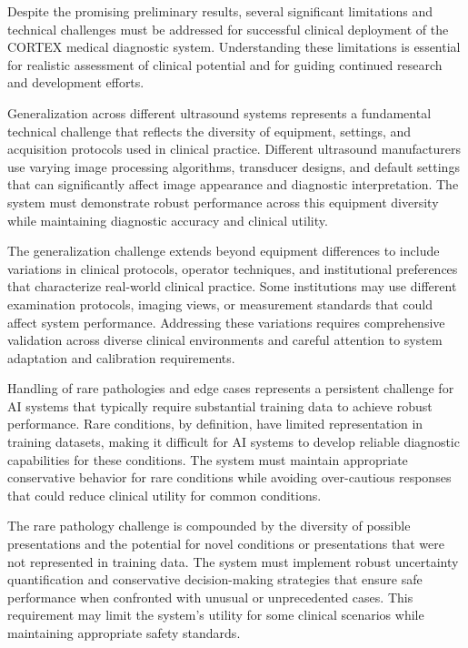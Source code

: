 Despite the promising preliminary results, several significant limitations and technical challenges must be addressed for successful clinical deployment of the CORTEX medical diagnostic system. Understanding these limitations is essential for realistic assessment of clinical potential and for guiding continued research and development efforts.

Generalization across different ultrasound systems represents a fundamental technical challenge that reflects the diversity of equipment, settings, and acquisition protocols used in clinical practice. Different ultrasound manufacturers use varying image processing algorithms, transducer designs, and default settings that can significantly affect image appearance and diagnostic interpretation. The system must demonstrate robust performance across this equipment diversity while maintaining diagnostic accuracy and clinical utility.

The generalization challenge extends beyond equipment differences to include variations in clinical protocols, operator techniques, and institutional preferences that characterize real-world clinical practice. Some institutions may use different examination protocols, imaging views, or measurement standards that could affect system performance. Addressing these variations requires comprehensive validation across diverse clinical environments and careful attention to system adaptation and calibration requirements.

Handling of rare pathologies and edge cases represents a persistent challenge for AI systems that typically require substantial training data to achieve robust performance. Rare conditions, by definition, have limited representation in training datasets, making it difficult for AI systems to develop reliable diagnostic capabilities for these conditions. The system must maintain appropriate conservative behavior for rare conditions while avoiding over-cautious responses that could reduce clinical utility for common conditions.

The rare pathology challenge is compounded by the diversity of possible presentations and the potential for novel conditions or presentations that were not represented in training data. The system must implement robust uncertainty quantification and conservative decision-making strategies that ensure safe performance when confronted with unusual or unprecedented cases. This requirement may limit the system's utility for some clinical scenarios while maintaining appropriate safety standards.

